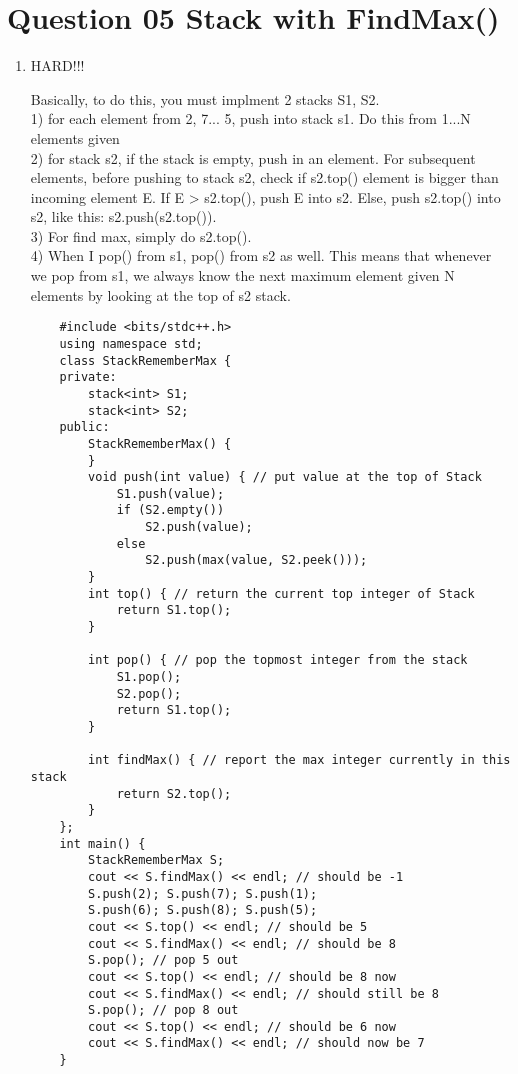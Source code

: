 \documentclass{article}
\begin{document}
\section{Question 05 Stack with FindMax()}
\begin{enumerate}[label=(\arabic*)]

\item HARD!!!

Basically, to do this, you must implment 2 stacks S1, S2.
\\
1) for each element from 2, 7... 5, push into stack s1. Do this from 1...N elements given
\\
2) for stack s2, if the stack is empty, push in an element. For subsequent elements, before pushing to stack s2, check if s2.top() element is bigger than incoming element E. If E > s2.top(), push E into s2. Else, push s2.top() into s2, like this: s2.push(s2.top()).
\\
3) For find max, simply do s2.top().
\\
4) When I pop() from s1, pop() from s2 as well. This means that whenever we pop from s1, we always know the next maximum element given N elements by looking at the top of s2 stack.
\\

\begin{verbatim}
    #include <bits/stdc++.h>
    using namespace std;
    class StackRememberMax {
    private:
        stack<int> S1;
        stack<int> S2;
    public:
        StackRememberMax() {
        }
        void push(int value) { // put value at the top of Stack
            S1.push(value);
            if (S2.empty())
                S2.push(value);
            else
                S2.push(max(value, S2.peek()));
        }
        int top() { // return the current top integer of Stack
            return S1.top();
        }
    
        int pop() { // pop the topmost integer from the stack
            S1.pop();
            S2.pop();
            return S1.top();
        }
        
        int findMax() { // report the max integer currently in this stack
            return S2.top();
        }
    };
    int main() {
        StackRememberMax S;
        cout << S.findMax() << endl; // should be -1
        S.push(2); S.push(7); S.push(1);
        S.push(6); S.push(8); S.push(5);
        cout << S.top() << endl; // should be 5
        cout << S.findMax() << endl; // should be 8
        S.pop(); // pop 5 out
        cout << S.top() << endl; // should be 8 now
        cout << S.findMax() << endl; // should still be 8
        S.pop(); // pop 8 out
        cout << S.top() << endl; // should be 6 now
        cout << S.findMax() << endl; // should now be 7
    }
\end{verbatim}

\end{enumerate}
\end{document}
